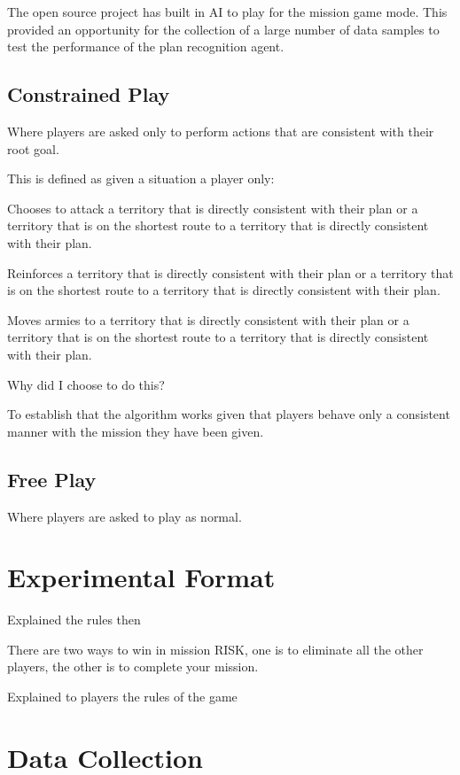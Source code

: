 \documentclass[parskip]{cs4rep}
\begin{document}
The open source project has built in AI to play for the mission game mode. This provided an opportunity for the collection of a large number of data samples to test the performance of the plan recognition agent.

\subsection{Constrained Play}

Where players are asked only to perform actions that are consistent with their root goal.

This is defined as given a situation a player only:

Chooses to attack a territory that is directly consistent with their plan or a territory that is on the shortest route to a territory that is directly consistent with their plan.

Reinforces a territory that is directly consistent with their plan or a territory that is on the shortest route to a territory that is directly consistent with their plan.

Moves armies to a territory that is directly consistent with their plan or a territory that is on the shortest route to a territory that is directly consistent with their plan.

Why did I choose to do this?

To establish that the algorithm works given that players behave only a consistent manner with the mission they have been given.

\subsection{Free Play}

Where players are asked to play as normal.

\section{Experimental Format}

Explained the rules then

There are two ways to win in mission RISK, one is to eliminate all the other players, the other is to complete your mission.

Explained to players the rules of the game 

\section{Data Collection}
\end{document}
